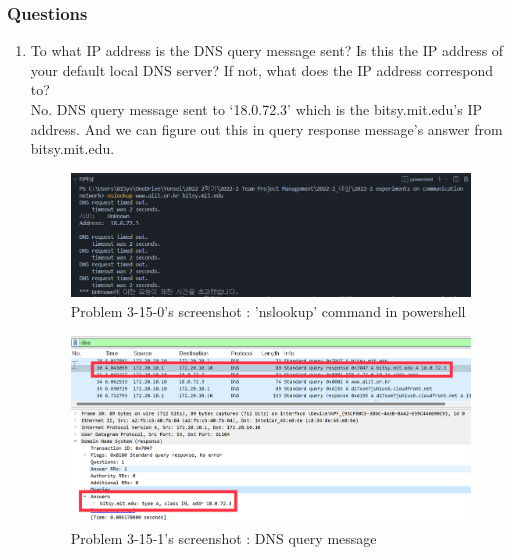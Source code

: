     \subsubsection*{Questions}
    \begin{enumerate}[label=\bfseries Problem \arabic*:,leftmargin=*,labelindent=1em]\addtocounter{enumi}{14}
        \item To what IP address is the DNS query message sent? 
        Is this the IP address of your default local DNS server? 
        If not, what does the IP address correspond to?\\[0.2mm]
            \soln No. DNS query message sent to ‘18.0.72.3’ which is the bitsy.mit.edu’s IP address. And we can figure out this in query response message’s answer from bitsy.mit.edu.
             \vspace{-2mm}  
            \begin{figure}[!h]\centering
        		\includegraphics[width=.78\textwidth]{image/result_week01/Q3-f-0.png}
        		\caption{\footnotesize Problem 3-15-0's screenshot : 'nslookup' command in powershell}
        		\vspace{-10pt}
            \end{figure}
            \begin{figure}[!h]\centering
        		\includegraphics[width=.79\textwidth]{image/result_week01/Q3-f-1.png}
        		\caption{\footnotesize Problem 3-15-1's screenshot : DNS query message}
        		\vspace{-10pt}
            \end{figure}

\end{enumerate}
